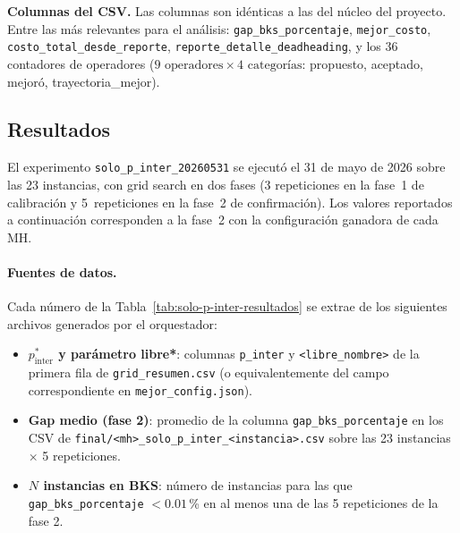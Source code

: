 \medskip
\noindent\textbf{Columnas del CSV.} Las columnas son idénticas a las
del núcleo del proyecto. Entre las más relevantes para el análisis:
\texttt{gap\_bks\_porcentaje}, \texttt{mejor\_costo},
\texttt{costo\_total\_desde\_reporte},
\texttt{reporte\_detalle\_deadheading}, y los 36 contadores de
operadores ($9\text{ operadores} \times 4\text{ categorías}$:
propuesto, aceptado, mejoró, trayectoria\_mejor).

\subsection{Resultados}

\begin{observacion}
El experimento \texttt{solo\_p\_inter\_20260531} se ejecutó el
31 de mayo de 2026 sobre las 23 instancias, con grid search en dos
fases (3 repeticiones en la fase~1 de calibración y 5~repeticiones en
la fase~2 de confirmación). Los valores reportados a continuación
corresponden a la fase~2 con la configuración ganadora de cada MH.
\end{observacion}

\paragraph{Fuentes de datos.}
Cada número de la Tabla~\ref{tab:solo-p-inter-resultados} se extrae
de los siguientes archivos generados por el orquestador:

\begin{itemize}
\item \textbf{$p_{\text{inter}}^*$ y parámetro libre*}: columnas
  \texttt{p\_inter} y \texttt{<libre\_nombre>} de la primera fila
  de \texttt{grid\_resumen.csv} (o equivalentemente del campo
  correspondiente en \texttt{mejor\_config.json}).
\item \textbf{Gap medio (fase 2)}: promedio de la columna
  \texttt{gap\_bks\_porcentaje} en los CSV de
  \texttt{final/<mh>\_solo\_p\_inter\_<instancia>.csv} sobre las
  23 instancias $\times$ 5 repeticiones.
\item \textbf{$N$ instancias en BKS}: número de instancias para las
  que \texttt{gap\_bks\_porcentaje} $< 0.01$\,\% en al menos una de
  las 5 repeticiones de la fase 2.
\end{itemize}


